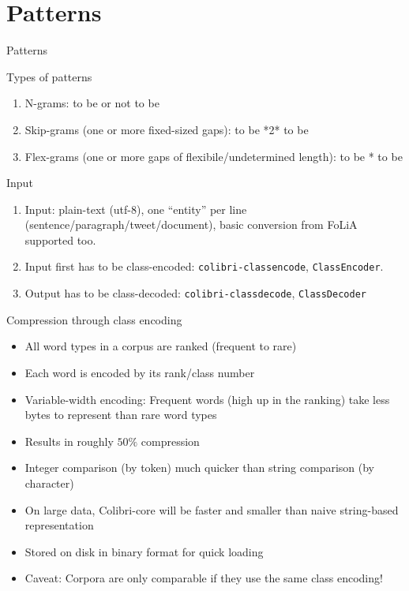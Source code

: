 \documentclass[compress]{beamer}
\begin{document}
\section{Patterns}

\begin{frame}{Patterns}
  \begin{block}{Types of patterns}
    \begin{enumerate}
      \item N-grams: to be or not to be
      \item Skip-grams (one or more fixed-sized gaps): to be {*2*} to be
      \item Flex-grams (one or more gaps of flexibile/undetermined length): to be {*} to be
    \end{enumerate}
  \end{block}
\end{frame}


\begin{frame}
  \begin{block}{Input}
    \begin{enumerate}
      \item Input: plain-text (utf-8), one ``entity'' per line
       (sentence/paragraph/tweet/document), basic conversion from FoLiA supported too.
     \item Input first has to be class-encoded: \texttt{colibri-classencode},
       \texttt{ClassEncoder}.
      \item Output has to be class-decoded: \texttt{colibri-classdecode},
        \texttt{ClassDecoder}
    \end{enumerate}
  \end{block}
\end{frame}

\begin{frame}

  \begin{block}{Compression through class encoding}
    \begin{itemize}
      \item All word types in a corpus are ranked (frequent to rare)
      \item Each word is encoded by its rank/class number
      \item Variable-width encoding: Frequent words (high up in the ranking)
        take less bytes to represent than rare word types
      \item Results in roughly $50\%$ compression
      \item Integer comparison (by token) much quicker than string comparison
        (by character)
      \item On large data, Colibri-core will be faster and smaller than naive string-based representation
      \item Stored on disk in binary format for quick loading
      \item Caveat: Corpora are only comparable if they use the same class
        encoding!
    \end{itemize}
  \end{block}

\end{frame}
\end{document}
